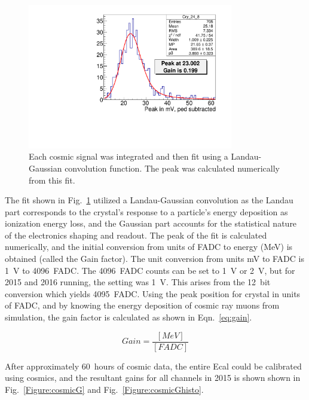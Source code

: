 \begin{figure}[H]
  \centering
      \includegraphics[width=0.8\textwidth]{pics/performance/cosmicFitExample2015.pdf}
  \caption[Integrated cosmic signal in Ecal fitted for calibration]{Each cosmic signal was integrated and then fit using a Landau-Gaussian convolution function. The peak was calculated numerically from this fit.}
  \label{Figure:cosmicFit}
\end{figure}

The fit shown in Fig.~\ref{Figure:cosmicFit} utilized a Landau-Gaussian convolution as the Landau part corresponds to the crystal's response to a particle's energy deposition as ionization energy loss, and the Gaussian part accounts for the statistical nature of the electronics shaping and readout. The peak of the fit is calculated numerically, and the initial conversion from units of FADC to energy (MeV) is obtained (called the Gain factor). The unit conversion from units mV to FADC is 1~V to 4096~FADC. The 4096~FADC counts can be set to 1~V or 2~V, but for 2015 and 2016 running, the setting was 1~V. This arises from the 12~bit conversion which yields 4095~FADC. Using the peak position for crystal in units of FADC, and by knowing the energy deposition of cosmic ray muons from simulation, the gain factor is calculated as shown in Eqn.~\eqref{eq:gain}.

\begin{equation}
	\label{eq:gain}
	Gain = \dfrac{[MeV]}{[FADC]} 
\end{equation}

After approximately 60~hours of cosmic data, the entire Ecal could be calibrated using cosmics, and the resultant gains for all channels in 2015 is shown shown in Fig.~\ref{Figure:cosmicG} and Fig.~\ref{Figure:cosmicGhisto}.

